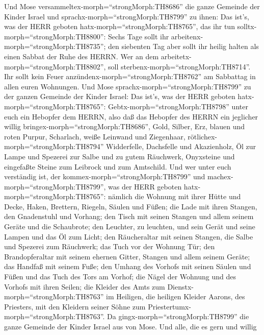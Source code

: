  Und Mose versammeltex-morph=``strongMorph:TH8686'' die
ganze Gemeinde der Kinder Israel und
sprachx-morph=``strongMorph:TH8799'' zu ihnen: Das ist's, was der HERR
geboten hatx-morph=``strongMorph:TH8765'', das ihr tun
solltx-morph=``strongMorph:TH8800'':  Sechs Tage sollt ihr
arbeitenx-morph=``strongMorph:TH8735''; den siebenten Tag aber sollt ihr
heilig halten als einen Sabbat der Ruhe des HERRN. Wer an dem
arbeitetx-morph=``strongMorph:TH8802'', soll
sterbenx-morph=``strongMorph:TH8714''.  Ihr sollt kein Feuer
anzündenx-morph=``strongMorph:TH8762'' am Sabbattag in allen euren
Wohnungen.  Und Mose sprachx-morph=``strongMorph:TH8799'' zu
der ganzen Gemeinde der Kinder Israel: Das ist's, was der HERR geboten
hatx-morph=``strongMorph:TH8765'': 
Gebtx-morph=``strongMorph:TH8798'' unter euch ein Hebopfer dem HERRN,
also daß das Hebopfer des HERRN ein jeglicher willig
bringex-morph=``strongMorph:TH8686'', Gold, Silber, Erz, 
blauen und roten Purpur, Scharlach, weiße Leinwand und Ziegenhaar,
 rötlichex-morph=``strongMorph:TH8794'' Widderfelle,
Dachsfelle und Akazienholz,  Öl zur Lampe und Spezerei zur
Salbe und zu gutem Räuchwerk,  Onyxsteine und eingefaßte
Steine zum Leibrock und zum Amtschild.  Und wer unter euch
verständig ist, der kommex-morph=``strongMorph:TH8799'' und
machex-morph=``strongMorph:TH8799'', was der HERR geboten
hatx-morph=``strongMorph:TH8765'':  nämlich die Wohnung mit
ihrer Hütte und Decke, Haken, Brettern, Riegeln, Säulen und Füßen;
 die Lade mit ihren Stangen, den Gnadenstuhl und Vorhang;
 den Tisch mit seinen Stangen und allem seinem Geräte und
die Schaubrote;  den Leuchter, zu leuchten, und sein Gerät
und seine Lampen und das Öl zum Licht;  den Räucheraltar
mit seinen Stangen, die Salbe und Spezerei zum Räuchwerk; das Tuch vor
der Wohnung Tür;  den Brandopferaltar mit seinem ehernen
Gitter, Stangen und allem seinem Geräte; das Handfaß mit seinem Fuße;
 den Umhang des Vorhofs mit seinen Säulen und Füßen und das
Tuch des Tors am Vorhof;  die Nägel der Wohnung und des
Vorhofs mit ihren Seilen;  die Kleider des Amts zum
Dienstx-morph=``strongMorph:TH8763'' im Heiligen, die heiligen Kleider
Aarons, des Priesters, mit den Kleidern seiner Söhne zum
Priestertumx-morph=``strongMorph:TH8763''.  Da
gingx-morph=``strongMorph:TH8799'' die ganze Gemeinde der Kinder Israel
aus von Mose.  Und alle, die es gern und willig
